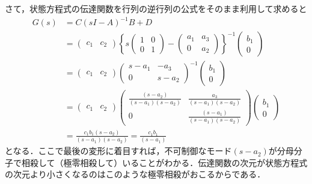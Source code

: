 さて，状態方程式の伝達関数を行列の逆行列の公式をそのまま利用して求めると
\begin{align}
	G(s) & = C(sI-A)^{-1}B + D
\nonumber \\
	&= 
		\left(\begin{array}{cc}
			c_1 & c_2 
		\end{array}\right)
		\left\{ 
			s
			\left(\begin{array}{cc}
				1 & 0 \\
				0 & 1 
			\end{array}\right)
			-
			\left(\begin{array}{cc}
				a_1 & a_3 \\
				0 & a_2
			\end{array}\right)
		\right\} ^{-1}
		\left(\begin{array}{c}
			b_1 \\
			0
		\end{array}\right)
\nonumber \\
	&= 
		\left(\begin{array}{cc}
			c_1 & c_2 
		\end{array}\right)
		\left(\begin{array}{cc}
			s - a_1 & - a_3 \\
			0       & s - a_2
		\end{array}\right) ^{-1}
		\left(\begin{array}{c}
			b_1 \\
			0
		\end{array}\right)
\nonumber \\
	&= 
		\left(\begin{array}{cc}
			c_1 & c_2 
		\end{array}\right)
		\left(\begin{array}{cc}
			\frac{(s-a_2)}{(s-a_1)(s-a_2)} & \frac{a_3}{(s-a_1)(s-a_2)} \\
			0       & \frac{(s-a_1)}{(s-a_1)(s-a_2)}
		\end{array}\right) 
		\left(\begin{array}{c}
			b_1 \\
			0
		\end{array}\right)
\nonumber \\
	&= 
		\frac{c_1 b_1(s-a_2)}{(s-a_1)(s-a_2)}
	= 
		\frac{c_1 b_1}{(s-a_1)}
\end{align}
となる．ここで最後の変形に着目すれば，不可制御なモード$(s-a_2)$が分母分子で相殺して（極零相殺して）いることがわかる．伝達関数の次元が状態方程式の次元より小さくなるのはこのような極零相殺がおこるからである．

